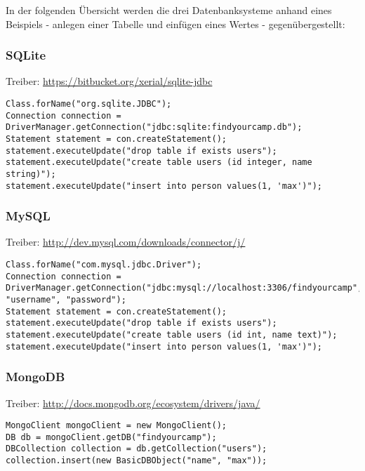 In der folgenden Übersicht werden die drei Datenbanksysteme anhand eines Beispiels - anlegen einer Tabelle und einfügen eines Wertes - gegenübergestellt:

\subsubsection{SQLite}

Treiber: \url{https://bitbucket.org/xerial/sqlite-jdbc}
\begin{lstlisting}[label=ls:mysqlexample,caption=Exemplarische Darstellung der Nutzung des SQLite Treibers]
Class.forName("org.sqlite.JDBC");
Connection connection = DriverManager.getConnection("jdbc:sqlite:findyourcamp.db");
Statement statement = con.createStatement();
statement.executeUpdate("drop table if exists users");
statement.executeUpdate("create table users (id integer, name string)");
statement.executeUpdate("insert into person values(1, 'max')");
\end{lstlisting}

\subsubsection{MySQL}

Treiber: \url{http://dev.mysql.com/downloads/connector/j/}
\begin{lstlisting}[label=ls:mysqlexample,caption=Exemplarische Darstellung der Nutzung des MySQL Treibers]
Class.forName("com.mysql.jdbc.Driver");
Connection connection = DriverManager.getConnection("jdbc:mysql://localhost:3306/findyourcamp", "username", "password");
Statement statement = con.createStatement();
statement.executeUpdate("drop table if exists users");
statement.executeUpdate("create table users (id int, name text)");
statement.executeUpdate("insert into person values(1, 'max')");
\end{lstlisting}

\subsubsection{MongoDB}

Treiber: \url{http://docs.mongodb.org/ecosystem/drivers/java/}
\begin{lstlisting}[label=ls:mongoexample,caption=Exemplarische Darstellung der Nutzung des MongoDB Treibers]
MongoClient mongoClient = new MongoClient();
DB db = mongoClient.getDB("findyourcamp");
DBCollection collection = db.getCollection("users");
collection.insert(new BasicDBObject("name", "max"));
\end{lstlisting}

